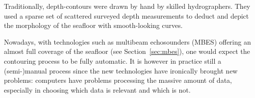 Traditionally, depth-contours were drawn by hand by skilled hydrographers.
They used a sparse set of scattered surveyed depth measurements to deduct and depict the morphology of the seafloor with smooth-looking curves.

%

Nowadays, with technologies such as multibeam echosounders (MBES) offering an almost full coverage of the seafloor (see Section~\ref{sec:mbes}), one would expect the contouring process to be fully automatic.
It is however in practice still a (semi-)manual process since the new technologies have ironically brought new problems: computers have problems processing the massive amount of data, especially in choosing which data is relevant and which is not.

%

